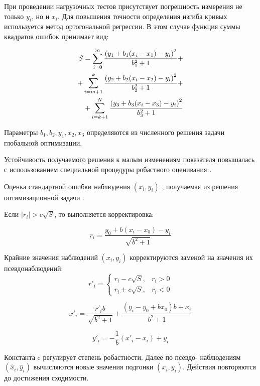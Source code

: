 При проведении нагрузочных тестов присутствует погрешность измерения не только \(y_{i}\), но и \(x_{i}\). Для повышения точности определения изгиба кривых используется метод ортогональной регрессии. В этом случае функция суммы квадратов ошибок принимает вид:

\begin{eqnarray}
S=\sum_{i=0}^m \frac{\left(y_{1}+b_{1}(x_{i}-x_{1})-y_{i} \right)^{2}}{b_{1}^{2}+1} + \\
+\sum_{i=m+1}^k \frac{\left(y_{2}+b_{2}(x_{i}-x_{2})-y_{i} \right)^{2}}{b_{2}^{2}+1}+ \notag\\
+\sum_{i=k+1}^N \frac{\left(y_{3}+b_{3}(x_{i}-x_{3})-y_{i} \right)^{2}}{b_{3}^{2}+1} \notag
\end{eqnarray}

Параметры \(b_{1}, b_{2}, y_{1}, x_{2}, x_{3}\) определяются из численного решения задачи глобальной оптимизации.

Устойчивость получаемого решения к малым изменениям показателя повышалась с использованием специальной процедуры робастного оценивания \cite{huber1984}. 

Оценка стандартной ошибки наблюдения \((x_{i}, y_{i})\) , получаемая из решения оптимизационной задачи \cite{Boggs1988}.

Если \(|r_{i}|>c\sqrt{S}\), то выполняется корректировка:

\begin{equation}
r_{i}=\frac{y_{0}+b(x_{i}-x_{0})-y_{i}}{\sqrt{b^{2}+1}}
\end{equation}

Крайние значения наблюдений \((x_{i}, y_{i})\) корректируются заменой на значения их псевдонаблюдений: 
\begin{equation}
r'_{i}=\begin{cases}
r_{i}-c\sqrt{S},& r_{i}>0 \\
r_{i}+c\sqrt{S},& r_{i}<0
\end{cases}
\end{equation}

\begin{equation}
x'_{i}=\frac{r'_{i}b}{\sqrt{b^{2}+1}}+\frac{(y_{i}-y_{0}+bx_{0})b+x_{i}}{b^{2}+1}
\end{equation}

\begin{equation}
y'_{i}=-\frac{1}{b}(x'_{i}-x_{i})+y_{i}
\end{equation}

Константа c регулирует степень робастности. Далее по псевдо- наблюдениям \((\hat{x}_{i}, \hat{y}_{i})\)  вычисляются новые значения   подгонки \((x_{i}, y_{i})\). Действия повторяются до достижения сходимости.

